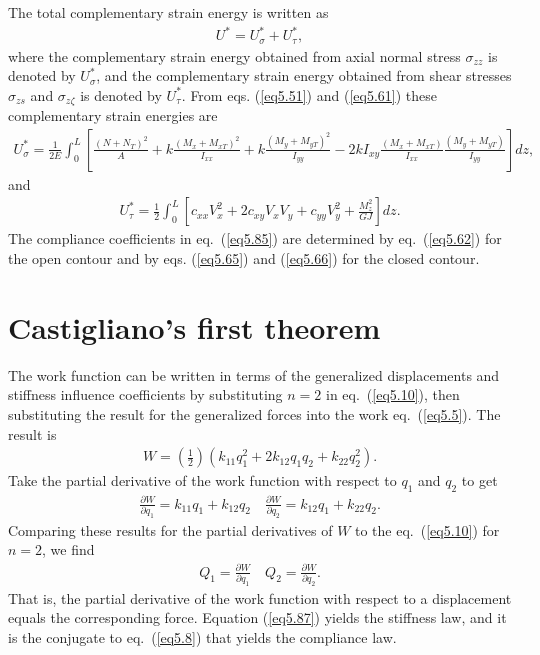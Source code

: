 \documentclass{AeroStructure-ERJohnson}
\begin{document}
The total complementary strain energy is written as
\begin{align}\label{eq5.83}
U^{*}=U_{\sigma}^{*}+U_{\tau}^{*},
\end{align}
where the complementary strain energy obtained from axial normal stress $\sigma_{z z}$ is denoted by $U_{\sigma}^{*}$, and the complementary strain energy obtained from shear stresses $\sigma_{z s}$ and $\sigma_{z \zeta}$ is denoted by $U_{\tau}^{*}$. From eqs. (\ref{eq5.51}) and (\ref{eq5.61}) these complementary strain energies are
\begin{align}\label{eq5.84}
U_{\sigma}^{*}=\frac{1}{2 E} \int_{0}^{L}\left[\frac{\left(N+N_{T}\right)^{2}}{A}+k \frac{\left(M_{x}+M_{x T}\right)^{2}}{I_{x x}}+k \frac{\left(M_{y}+M_{y T}\right)^{2}}{I_{y y}}-2 k I_{x y} \frac{\left(M_{x}+M_{x T}\right)}{I_{x x}} \frac{\left(M_{y}+M_{y T}\right)}{I_{y y}}\right] d z,
\end{align}
and
\begin{align}\label{eq5.85}
U_{\tau}^{*}=\frac{1}{2} \int_{0}^{L}\left[c_{x x} V_{x}^{2}+2 c_{x y} V_{x} V_{y}+c_{y y} V_{y}^{2}+\frac{M_{z}^{2}}{G J}\right] d z.
\end{align}
The compliance coefficients in eq.~(\ref{eq5.85}) are determined by eq.~(\ref{eq5.62}) for the open contour and by eqs. (\ref{eq5.65}) and (\ref{eq5.66}) for the closed contour.

\section{Castigliano's first theorem}\label{sec5.7}

The work function can be written in terms of the generalized displacements and stiffness influence coefficients by substituting $n=2$ in eq.~(\ref{eq5.10}), then substituting the result for the generalized forces into the work eq.~(\ref{eq5.5}). The result is
\begin{align}\label{eq5.86}
W=\left(\frac{1}{2}\right)\left(k_{11} q_{1}^{2}+2 k_{12} q_{1} q_{2}+k_{22} q_{2}^{2}\right).
\end{align}
Take the partial derivative of the work function with respect to $q_1$ and $q_2$ to get
\begin{align*}
\frac{\partial W}{\partial q_{1}}=k_{11} q_{1}+k_{12} q_{2} \quad \frac{\partial W}{\partial q_{2}}=k_{12} q_{1}+k_{22} q_{2}.
\end{align*}
Comparing these results for the partial derivatives of $W$ to the eq.~(\ref{eq5.10}) for $n=2$, we find
\begin{align}\label{eq5.87}
Q_{1}=\frac{\partial W}{\partial q_{1}} \quad Q_{2}=\frac{\partial W}{\partial q_{2}}.
\end{align}
That is, the partial derivative of the work function with respect to a displacement equals the corresponding force. Equation (\ref{eq5.87}) yields the stiffness law, and it is the conjugate to eq.~(\ref{eq5.8}) that yields the compliance law.
\end{document}
